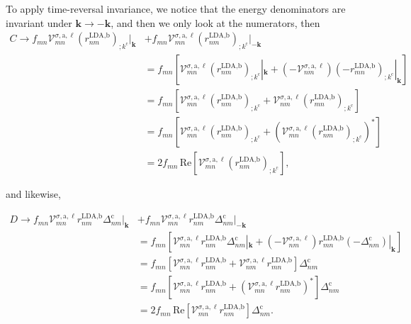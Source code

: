 To apply time-reversal invariance,
we notice that the energy denominators are 
invariant under $\mathbf{k} \rightarrow - \mathbf{k}$, 
and then we only look at the numerators, then 
\begin{align}\label{ct}
C \rightarrow f_{mn}\mathcal{V}^{\sigma,\text{a},\ell}_{mn}
    \left(r^{\text{LDA,b}}_{nm}\right)_{;k^{\text{c}}}|_{\mathbf{k}}
&+  f_{mn}\mathcal{V}^{\sigma,\text{a},\ell}_{mn}
    \left(r^{\text{LDA,b}}_{nm}\right)_{;k^{\text{c}}}|_{-\mathbf{k}}\nonumber\\
&=  f_{mn}\left[\mathcal{V}^{\sigma,\text{a},\ell}_{mn}
    \left(r^{\text{LDA,b}}_{nm}\right)_{;k^{\text{c}}}|_{\mathbf{k}} 
+   \left(-\mathcal{V}^{\sigma,\text{a},\ell}_{nm}\right)
    \left(-r^{\text{LDA,b}}_{mn}\right)_{;k^{\text{c}}}|_{\mathbf{k}}\right]
    \nonumber\\
&= f_{mn}\left[\mathcal{V}^{\sigma,\text{a},\ell}_{mn}
    \left(r^{\text{LDA,b}}_{nm}\right)_{;k^{\text{c}}}
+   \mathcal{V}^{\sigma,\text{a},\ell}_{nm}
    \left(r^{\text{LDA,b}}_{mn}\right)_{;k^{\text{c}}}\right]\nonumber\\
&= f_{mn}\left[\mathcal{V}^{\sigma,\text{a},\ell}_{mn} 
    \left(r^{\text{LDA,b}}_{nm}\right)_{;k^{\text{c}}}
+   \left(\mathcal{V}^{\sigma,\text{a},\ell}_{mn}
    \left(r^{\text{LDA,b}}_{nm}\right)_{;k^{\text{c}}}\right)^*\right]\nonumber\\
&=  2f_{mn}\,\mathrm{Re}\left[\mathcal{V}^{\sigma,\text{a},\ell}_{mn}
    \left(r^{\text{LDA,b}}_{nm}\right)_{;k^{\text{c}}}\right]
,
\end{align}

and likewise,

\begin{align}\label{dt}
D \rightarrow f_{mn}\mathcal{V}^{\sigma,\text{a},\ell}_{mn}
    r^{\text{LDA,b}}_{nm}\Delta^{\text{c}}_{nm}|_{\mathbf{k}} 
&+  f_{mn}\mathcal{V}^{\sigma,\text{a},\ell}_{mn}r^{\text{LDA,b}}_{nm}
    \Delta^{\text{c}}_{nm}|_{-\mathbf{k}}\nonumber\\
&=  f_{mn}\left[\mathcal{V}^{\sigma,\text{a},\ell}_{mn}r^{\text{LDA,b}}_{nm}
    \Delta^{\text{c}}_{nm}|_{\mathbf{k}}
+   \left(-\mathcal{V}^{\sigma,\text{a},\ell}_{nm}\right)r^{\text{LDA,b}}_{mn}
    \left(-\Delta^{\text{c}}_{nm}\right)|_{\mathbf{k}}\right]\nonumber\\
&=  f_{mn}\left[\mathcal{V}^{\sigma,\text{a},\ell}_{mn}r^{\text{LDA,b}}_{nm}
+   \mathcal{V}^{\sigma,\text{a},\ell}_{nm}r^{\text{LDA,b}}_{mn}\right]
    \Delta^{\text{c}}_{nm}\nonumber\\
&=  f_{mn}\left[\mathcal{V}^{\sigma,\text{a},\ell}_{mn}r^{\text{LDA,b}}_{nm}
+   \left(\mathcal{V}^{\sigma,\text{a},\ell}_{mn}
    r^{\text{LDA,b}}_{nm}\right)^*\right]\Delta^{\text{c}}_{nm}\nonumber\\
&=  2f_{mn}\,\mathrm{Re}\left[\mathcal{V}^{\sigma,\text{a},\ell}_{mn}
    r^{\text{LDA,b}}_{nm}\right]\Delta^{\text{c}}_{nm}
.
\end{align}

